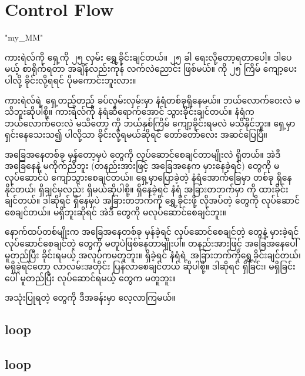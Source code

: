 \chapter{Control Flow}
\XeTeXlinebreaklocale "my_MM"  %
\begin{sloppypar}

ကားရဲလ်ကို ရှေ့ကို ၂၅ လှမ်း ရွှေ့ခိုင်းချင်တယ်။ {} ၂၅ ခါ ရေးလို့‌တော့ရတာပေါ့။ ဒါပေမယ့် စာရိုက်ရတာ အချိန်လည်းကုန် လက်လဲညောင်း ဖြစ်မယ်။ {} ကို ၂၅ ကြိမ် ကျော့ပေးပါလို့ ခိုင်းလို့ရရင် ပိုမကောင်းဘူးလား။ 

ကားရဲလ်ရဲ့ ရှေ့တည့်တည့် ခပ်လှမ်းလှမ်းမှာ နံရံတစ်ခုရှိနေမယ်။ ဘယ်လောက်ဝေးလဲ မသိဘူးဆိုပါစို့။ ကားရဲလ်ကို နံရံဆီရောက်အောင် သွားခိုင်းချင်တယ်။ နံရံက ဘယ်လောက်ဝေးလဲ မသိတော့ {} ကို ဘယ်နှစ်ကြိမ် ကျော့ခိုင်းရမလဲ မသိနိုင်ဘူး။ ရှေ့မှာရှင်းနေသေးသ၍ {} ပါလို့သာ ခိုင်းလို့ရမယ်ဆိုရင် တော်တော်လေး အဆင်ပြေပြီ။ 

အခြေအနေတစ်ခု မှန်တော့မှပဲ \mmcommand တွေကို လုပ်ဆောင်စေချင်တာမျိုးလဲ ရှိတယ်။ အဲဒီ အခြေနေနဲ့ မကိုက်ညီဘူး (တနည်းအားဖြင့် အခြေအနေက မှားနေခဲ့ရင်) \mmcommand တွေကို မလုပ်ဆောင်ပဲ ကျော်သွားစေချင်တယ်။ ရှေ့မှာပြောခဲ့တဲ့ နံရံအောက််ခြေမှာ \mmbeeper တစ်ခု ရှိနေနိုင်တယ်၊ ရှိချင်မှလည်း ရှိမယ်ဆိုပါစို့။ \mmbeeper ရှိနေခဲ့ရင် နံရံ အခြားတဘက်မှာ \mmbeeper ကို ထားခိုင်းချင်တယ်။  ဒါဆိုရင် \mmbeeper ရှိနေမှပဲ အခြားတဘက်ကို ရွှေ့ခိုင်းဖို့ လိုအပ်တဲ့ \mmcommand တွေကို လုပ်ဆောင်စေချင်တယ်။ \mmbeeper မရှိဘူးဆိုရင် အဲဒီ \mmcommand တွေကို မလုပ်ဆောင်စေချင်ဘူး။  

 နောက်ထပ်တစ်မျိုးက အခြေအနေတစ်ခု မှန်ခဲ့ရင် လုပ်ဆောင်စေချင်တဲ့ \mmcommand တွေနဲ့ မှားခဲ့ရင်‌ လုပ်ဆောင်စေချင်တဲ့ \mmcommand ‌တွေကို မတူပဲဖြစ်နေတာမျိုးပါ။ တနည်းအားဖြင့် အခြေအနေပေါ် မူတည်ပြီး ခိုင်းရမယ့် အလုပ်ကမတူဘူး။ \mmbeeper ရှိခဲ့ရင် နံရံရဲ့ အခြားဘက်ကိုရွှေ့ခိုင်းချင်တယ်၊ မရှိခဲ့ရင်တော့ လာလမ်းအတိုင်း ပြန်လာစေချင်တယ် ဆိုပါစို့။ ဒါဆိုရင် \mmbeeper ရှိခြင်း၊ မရှိခြင်းပေါ် မူတည်ပြီး လုပ်ဆောင်ရမယ့် \mmcommand တွေက မတူဘူး။ 


 အသုံးပြုရတဲ့ {}တွေကို ဒီအခန်းမှာ ‌လေ့လာကြမယ်။


 \section{{} loop}

 \section{{} loop}


\end{sloppypar}
